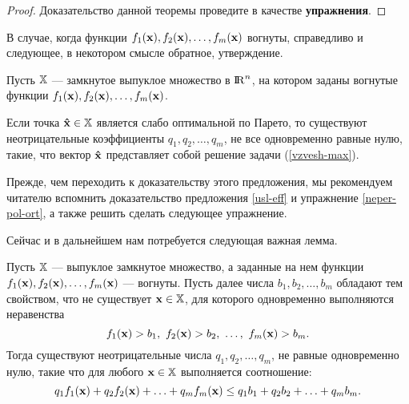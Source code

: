 \begin{proof}
Доказательство данной теоремы проведите в качестве
\textbf{упражнения}.
\end{proof}

    В случае, когда функции $f_1(\mathbf{x}), f_2(\mathbf{x}), \ldots, f_m(\mathbf{x})$ вогнуты,
    справедливо и следующее, в некотором смысле обратное, утверждение.

    \begin{prop}\label{teo:property_weak_optimal}
Пусть $\mathbb{X}$ --- замкнутое выпуклое множество в ${\rm I\!R}^n$, на котором заданы вогнутые функции
$f_1(\mathbf{x}), f_2(\mathbf{x}), \ldots, f_m(\mathbf{x})$.

Если точка $\mathbf{\hat x} \in \mathbb{X}$ является слабо оптимальной по Парето, то существуют
неотрицательные коэффициенты $q_1, q_2, \ldots, q_m$, не все одновременно равные нулю, такие,
что вектор $\mathbf{\hat x}$ представляет собой решение задачи (\ref{vzvesh-max}).
\end{prop}

    Прежде, чем переходить к доказательству этого предложения, мы рекомендуем читателю
    вспомнить доказательство предложения \ref{usl-eff} и упражнение \ref{neper-pol-ort}, а
    также решить сделать следующее упражнение.



    Сейчас и в дальнейшем нам потребуется следующая важная лемма.


\begin{lemp} \label{fund-lemma}

Пусть $\mathbb{X}$ --- выпуклое замкнутое множество, а заданные на нем
функции $f_1(\mathbf{x}), f_2(\mathbf{x}), \ldots, f_m(\mathbf{x})$ --- вогнуты.
Пусть далее числа $b_1, b_2, \ldots, b_m$ обладают тем свойством,
что не существует $\mathbf{x} \in \mathbb{X}$, для которого одновременно
выполняются неравенства
\[
 f_1(\mathbf{x}) > b_1, \ f_2(\mathbf{x}) > b_2, \  \ldots,  \  f_m(\mathbf{x}) > b_m.
\]
Тогда существуют  неотрицательные числа
    $q_1, q_2, \ldots,q_m$, не равные одновременно  нулю, такие что для любого $\mathbf{x} \in
\mathbb{X}$ выполняется соотношение:
\begin{equation}\label{eq:ineq_fund_lemma}
    q_1 f_1(\mathbf{x}) + q_2 f_2(\mathbf{x}) + \ldots + q_m f_m(\mathbf{x}) \leq
    q_1 b_1 + q_2 b_2 + \ldots + q_m b_m.
\end{equation}

\end{lemp}



